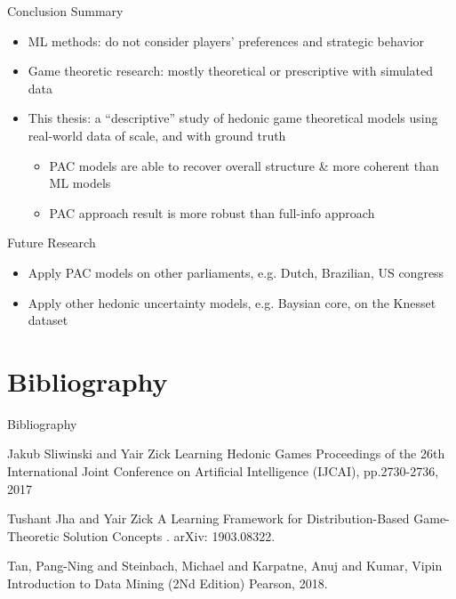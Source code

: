 \documentclass[xcolor=dvipsnames]{beamer}
\begin{document}
\begin{frame}{Conclusion}
  Summary
  \begin{itemize}
    \item ML methods: do not consider players' preferences and strategic behavior
    \item Game theoretic research: mostly theoretical or prescriptive with simulated data
    \item This thesis: a ``descriptive'' study of hedonic game theoretical models using real-world data of scale, and with ground truth
    \begin{itemize}
      \item PAC models are able to recover overall structure \& more coherent than ML models
      \item PAC approach result is more robust than full-info approach
    \end{itemize}
  \end{itemize}

  Future Research
  \begin{itemize}
  \item Apply PAC models on other parliaments, e.g. Dutch, Brazilian, US congress
  \item Apply other hedonic uncertainty models, e.g. Baysian core, on the Knesset dataset
  \end{itemize}
\end{frame}


\section*{Bibliography}
\begin{frame}{Bibliography}
  \begin{thebibliography}{10}

    Jakub Sliwinski and Yair Zick
    \newblock Learning Hedonic Games
    \newblock Proceedings of the 26th International Joint Conference on Artificial Intelligence (IJCAI), pp.2730-2736, 2017

    Tushant Jha and Yair Zick
    \newblock A Learning Framework for Distribution-Based Game-Theoretic Solution Concepts
    . arXiv: 1903.08322.

    Tan, Pang-Ning and Steinbach, Michael and Karpatne, Anuj and Kumar, Vipin
    \newblock Introduction to Data Mining (2Nd Edition)
    \newblock Pearson, 2018.

  \end{thebibliography}
\end{frame}
\end{document}

